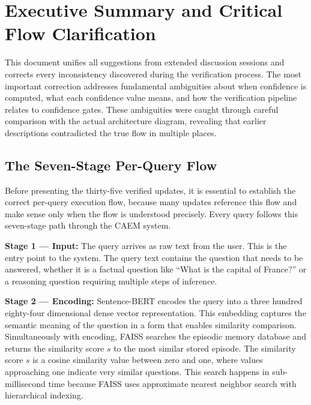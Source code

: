 \documentclass[11pt,a4paper]{article}
\begin{document}
\newpage
\tableofcontents
\newpage

\section{Executive Summary and Critical Flow Clarification}

This document unifies all suggestions from extended discussion sessions and corrects every inconsistency discovered during the verification process. The most important correction addresses fundamental ambiguities about when confidence is computed, what each confidence value means, and how the verification pipeline relates to confidence gates. These ambiguities were caught through careful comparison with the actual architecture diagram, revealing that earlier descriptions contradicted the true flow in multiple places.

\subsection{The Seven-Stage Per-Query Flow}

Before presenting the thirty-five verified updates, it is essential to establish the correct per-query execution flow, because many updates reference this flow and make sense only when the flow is understood precisely. Every query follows this seven-stage path through the CAEM system.

\textbf{Stage 1 — Input:} The query arrives as raw text from the user. This is the entry point to the system. The query text contains the question that needs to be answered, whether it is a factual question like ``What is the capital of France?'' or a reasoning question requiring multiple steps of inference.

\textbf{Stage 2 — Encoding:} Sentence-BERT encodes the query into a three hundred eighty-four dimensional dense vector representation. This embedding captures the semantic meaning of the question in a form that enables similarity comparison. Simultaneously with encoding, FAISS searches the episodic memory database and returns the similarity score $s$ to the most similar stored episode. The similarity score $s$ is a cosine similarity value between zero and one, where values approaching one indicate very similar questions. This search happens in sub-millisecond time because FAISS uses approximate nearest neighbor search with hierarchical indexing.
\end{document}
